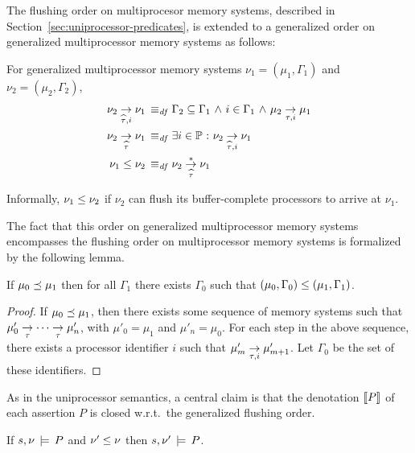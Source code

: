 \documentclass[11pt]{report}
\begin{document}
The flushing order on multiprocesor memory systems, described in Section~\ref{sec:uniprocessor-predicates}, is extended to a generalized order on generalized multiprocessor memory systems as follows: 
\begin{definition}
  For generalized multiprocessor memory systems $\nu_1 = (\mu_1,\Gamma_1)$ and $\nu_2 = (\mu_2,\Gamma_2)$, \begin{align*}
    \nu_2 \underset{\widehat{\tau},i}{\rightarrow} \nu_1 \operatorname{\;\equiv_{\mathit{df}}\;} & \Gamma_2 \subseteq \Gamma_1 \operatorname{\,\wedge\,} i \in \Gamma_1 \operatorname{\,\wedge\,} \mu_2 \underset{\tau,i}{\rightarrow} \mu_1 \\ 
    \nu_2 \underset{\widehat{\tau}}{\rightarrow} \nu_1 \operatorname{\;\equiv_{\mathit{df}}\;} & \exists i \in \mathbb{P} \operatorname{\,:\,} \nu_2 \underset{\widehat{\tau},i}{\rightarrow} \nu_1 \\ 
    \nu_1 \leq \nu_2 \operatorname{\;\equiv_{\mathit{df}}\;} & \nu_2 \overset{\ast}{\underset{\widehat{\tau}}{\rightarrow}} \nu_1
  \end{align*} 
\end{definition} Informally, $\nu_1 \leq \nu_2$ if $\nu_2$ can flush its buffer-complete processors to arrive at $\nu_1$. 

The fact that this order on generalized multiprocessor memory systems encompasses the flushing order on multiprocessor memory systems is formalized by the following lemma. 

\begin{lemma}
  \label{lem:generalized-order-encompasses-flushing-order}
  If $\mu_0 \preceq \mu_1$ then for all $\Gamma_1$ there exists $\Gamma_0$ such that $(\mu_0,\Gamma_0) \leq (\mu_1,\Gamma_1)$. 
\end{lemma}

\begin{proof}
  If $\mu_0 \preceq \mu_1$, then there exists some sequence of memory systems such that $\mu'_0 \underset{\tau}{\rightarrow} \cdots \underset{\tau}{\rightarrow} \mu'_n$, with $\mu'_0 = \mu_1$ and $\mu'_n = \mu_0$. For each step in the above sequence, there exists a processor identifier $i$ such that $\mu'_m \underset{\tau,i}{\rightarrow} \mu'_{m+1}$. Let $\Gamma_0$ be the set of these identifiers. 
\end{proof}

As in the uniprocessor semantics, a central claim is that the denotation $[\![P]\!]$ of each assertion $P$ is closed w.r.t.\ the generalized flushing order. 

\begin{lemma}
  \label{lem:generalized-flushing-closure}
  If $s,\nu \,\models\, P$ and $\nu' \leq \nu$ then $s,\nu' \,\models\, P$. 
\end{lemma}
\end{document}
